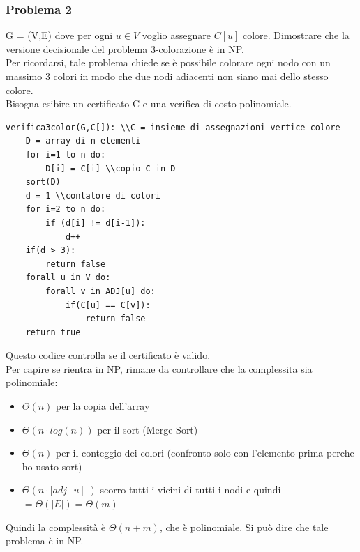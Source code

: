 \documentclass[a4paper,12pt]{article}
\begin{document}
\subsubsection{Problema 2}
G = (V,E) dove per ogni $u \in V$ voglio assegnare $C[u]$ colore. Dimostrare che la versione decisionale del problema 3-colorazione è in NP.\\
Per ricordarsi, tale problema chiede se è possibile colorare ogni nodo con un massimo 3 colori in modo che due nodi adiacenti non siano mai dello stesso colore.\\
Bisogna esibire un certificato C e una verifica di costo polinomiale.\\
\begin{lstlisting}
verifica3color(G,C[]): \\C = insieme di assegnazioni vertice-colore
    D = array di n elementi
    for i=1 to n do:
        D[i] = C[i] \\copio C in D
    sort(D)
    d = 1 \\contatore di colori
    for i=2 to n do:
        if (d[i] != d[i-1]):
            d++
    if(d > 3):
        return false
    forall u in V do:
        forall v in ADJ[u] do:
            if(C[u] == C[v]):
                return false
    return true
\end{lstlisting}
Questo codice controlla se il certificato è valido.\\
Per capire se rientra in NP, rimane da controllare che la complessita sia polinomiale:
\begin{itemize}
    \item $\Theta(n)$ per la copia dell'array
    \item $\Theta(n \cdot log(n))$ per il sort (Merge Sort)
    \item $\Theta(n)$ per il conteggio dei colori (confronto solo con l'elemento prima perche ho usato sort)
    \item $\Theta(n \cdot |adj[u]|)$ scorro tutti i vicini di tutti i nodi e quindi $ = \Theta(|E|) = \Theta(m)$
\end{itemize}
Quindi la complessità è $\Theta(n + m)$, che è polinomiale. Si può dire che tale problema è in NP.
\end{document}
